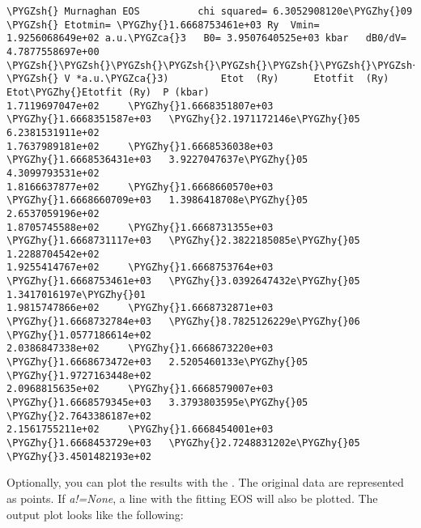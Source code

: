\documentclass[letterpaper,10pt,english]{sphinxmanual}
\def\PYGZca{\char`\^}
\def\PYGZsh{\char`\#}
\def\PYGZhy{\char`\-}
\begin{document}
\begin{Verbatim}[commandchars=\\\{\}]
\PYGZsh{} Murnaghan EOS 		 chi squared= 6.3052908120e\PYGZhy{}09
\PYGZsh{} Etotmin= \PYGZhy{}1.6668753461e+03 Ry	 Vmin= 1.9256068649e+02 a.u.\PYGZca{}3	 B0= 3.9507640525e+03 kbar	 dB0/dV= 4.7877558697e+00
\PYGZsh{}\PYGZsh{}\PYGZsh{}\PYGZsh{}\PYGZsh{}\PYGZsh{}\PYGZsh{}\PYGZsh{}\PYGZsh{}\PYGZsh{}\PYGZsh{}\PYGZsh{}\PYGZsh{}\PYGZsh{}\PYGZsh{}\PYGZsh{}\PYGZsh{}\PYGZsh{}\PYGZsh{}\PYGZsh{}\PYGZsh{}\PYGZsh{}\PYGZsh{}\PYGZsh{}\PYGZsh{}\PYGZsh{}\PYGZsh{}\PYGZsh{}\PYGZsh{}\PYGZsh{}\PYGZsh{}\PYGZsh{}\PYGZsh{}\PYGZsh{}\PYGZsh{}\PYGZsh{}\PYGZsh{}\PYGZsh{}\PYGZsh{}\PYGZsh{}\PYGZsh{}\PYGZsh{}\PYGZsh{}\PYGZsh{}\PYGZsh{}\PYGZsh{}\PYGZsh{}\PYGZsh{}\PYGZsh{}\PYGZsh{}\PYGZsh{}\PYGZsh{}\PYGZsh{}\PYGZsh{}\PYGZsh{}\PYGZsh{}\PYGZsh{}\PYGZsh{}\PYGZsh{}\PYGZsh{}\PYGZsh{}\PYGZsh{}\PYGZsh{}\PYGZsh{}\PYGZsh{}\PYGZsh{}\PYGZsh{}\PYGZsh{}\PYGZsh{}\PYGZsh{}\PYGZsh{}\PYGZsh{}\PYGZsh{}\PYGZsh{}\PYGZsh{}\PYGZsh{}\PYGZsh{}\PYGZsh{}\PYGZsh{}\PYGZsh{}
\PYGZsh{} V *a.u.\PYGZca{}3) 		 Etot  (Ry)		 Etotfit  (Ry)		 Etot\PYGZhy{}Etotfit (Ry)	P (kbar)
1.7119697047e+02 	 \PYGZhy{}1.6668351807e+03	 \PYGZhy{}1.6668351587e+03	 \PYGZhy{}2.1971172146e\PYGZhy{}05	 6.2381531911e+02
1.7637989181e+02 	 \PYGZhy{}1.6668536038e+03	 \PYGZhy{}1.6668536431e+03	 3.9227047637e\PYGZhy{}05	 4.3099793531e+02
1.8166637877e+02 	 \PYGZhy{}1.6668660570e+03	 \PYGZhy{}1.6668660709e+03	 1.3986418708e\PYGZhy{}05	 2.6537059196e+02
1.8705745588e+02 	 \PYGZhy{}1.6668731355e+03	 \PYGZhy{}1.6668731117e+03	 \PYGZhy{}2.3822185085e\PYGZhy{}05	 1.2288704542e+02
1.9255414767e+02 	 \PYGZhy{}1.6668753764e+03	 \PYGZhy{}1.6668753461e+03	 \PYGZhy{}3.0392647432e\PYGZhy{}05	 1.3417016197e\PYGZhy{}01
1.9815747866e+02 	 \PYGZhy{}1.6668732871e+03	 \PYGZhy{}1.6668732784e+03	 \PYGZhy{}8.7825126229e\PYGZhy{}06	 \PYGZhy{}1.0577186614e+02
2.0386847338e+02 	 \PYGZhy{}1.6668673220e+03	 \PYGZhy{}1.6668673472e+03	 2.5205460133e\PYGZhy{}05	 \PYGZhy{}1.9727163448e+02
2.0968815635e+02 	 \PYGZhy{}1.6668579007e+03	 \PYGZhy{}1.6668579345e+03	 3.3793803595e\PYGZhy{}05	 \PYGZhy{}2.7643386187e+02
2.1561755211e+02 	 \PYGZhy{}1.6668454001e+03	 \PYGZhy{}1.6668453729e+03	 \PYGZhy{}2.7248831202e\PYGZhy{}05	 \PYGZhy{}3.4501482193e+02
\end{Verbatim}

Optionally, you can plot the results with the . The original data are represented as points. If \emph{a!=None}, a line with the fitting EOS will also be plotted. The output plot looks like the following:
\end{document}
